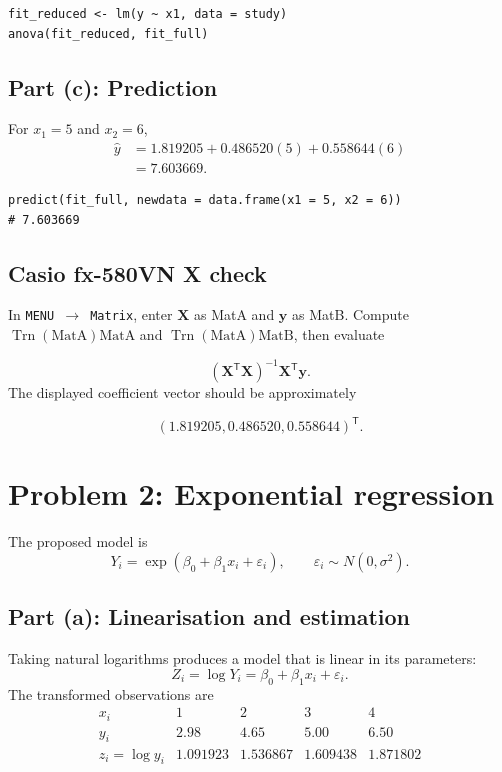 ﻿\documentclass[11pt]{article}
\begin{document}
\begin{lstlisting}
fit_reduced <- lm(y ~ x1, data = study)
anova(fit_reduced, fit_full)
\end{lstlisting}

\subsection{Part (c): Prediction}

For $x_1=5$ and $x_2=6$,
\begin{align*}
\widehat y
&=1.819205+0.486520(5)+0.558644(6)\\
&=\boxed{7.603669}.
\end{align*}

\begin{lstlisting}
predict(fit_full, newdata = data.frame(x1 = 5, x2 = 6))
# 7.603669
\end{lstlisting}

\subsection*{Casio fx-580VN X check}

In \texttt{MENU $\to$ Matrix}, enter $\bm X$ as MatA and $\bm y$ as
MatB. Compute $\operatorname{Trn}(\text{MatA})\text{MatA}$ and
$\operatorname{Trn}(\text{MatA})\text{MatB}$, then evaluate

\[
(\bm X^{\mathsf T}\bm X)^{-1}\bm X^{\mathsf T}\bm y.
\]
The displayed
coefficient vector should be approximately

\[
(1.819205,0.486520,0.558644)^{\mathsf T}.
\]

\section{Problem 2: Exponential regression}

The proposed model is
\[
  Y_i=\exp(\beta_0+\beta_1x_i+\varepsilon_i),
  \qquad \varepsilon_i\sim N(0,\sigma^2).
\]

\subsection{Part (a): Linearisation and estimation}

Taking natural logarithms produces a model that is linear in its parameters:
\[
  Z_i=\log Y_i=\beta_0+\beta_1x_i+\varepsilon_i.
\]
The transformed observations are
\[
\begin{array}{c|cccc}
x_i&1&2&3&4\\ \hline
y_i&2.98&4.65&5.00&6.50\\
z_i=\log y_i&1.091923&1.536867&1.609438&1.871802
\end{array}
\]
\end{document}

